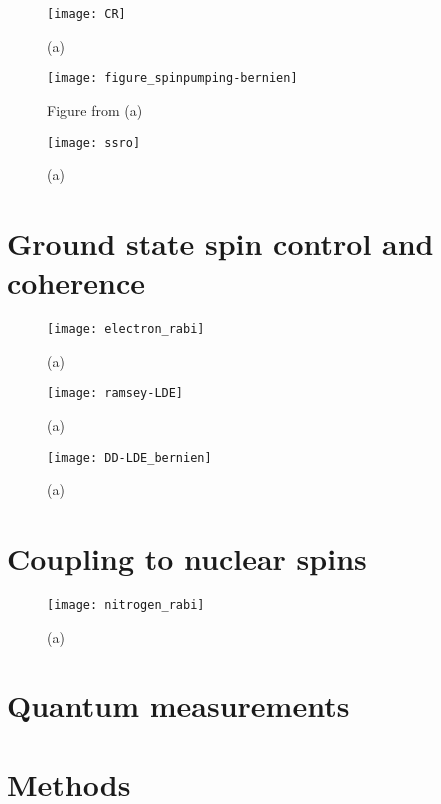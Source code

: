 \begin{figure*}
	\centering
	\texttt{[image: CR]}
	\caption{\label{fig:tam-fig4-cr} \textbf{} (a) }
\end{figure*}

\begin{figure*}
	\centering
	\texttt{[image: figure\_spinpumping-bernien]}
	\caption{\label{fig:tam-fig5-SP} Figure from \cite{Bernien__2014} \textbf{} (a) }
\end{figure*}

\begin{figure*}
	\centering
	\texttt{[image: ssro]}
	\caption{\label{fig:tam-fig6-ssro} \textbf{} (a) }
\end{figure*}

\section{Ground state spin control and coherence}
\label{sec:groundstatecontrol}
\begin{figure*}
	\centering
	\texttt{[image: electron\_rabi]}
	\caption{\label{fig:tam-fig7-erabi} \textbf{} (a) }
\end{figure*}

\begin{figure*}
	\centering
	\texttt{[image: ramsey-LDE]}
	\caption{\label{fig:tam-fig8-eramsey} \textbf{} (a) }
\end{figure*}

\begin{figure*}
	\centering
	\texttt{[image: DD-LDE\_bernien]}
	\caption{\label{fig:tam-fig9-DD} \textbf{} (a) }
\end{figure*}

\section{Coupling to nuclear spins}
\label{sec:nuclearspins}
\begin{figure*}
	\centering
	\texttt{[image: nitrogen\_rabi]}
	\caption{\label{fig:tam-fig10-nrabi} \textbf{} (a) }
\end{figure*}
\section{Quantum measurements}


\section{Methods}



\newpage




